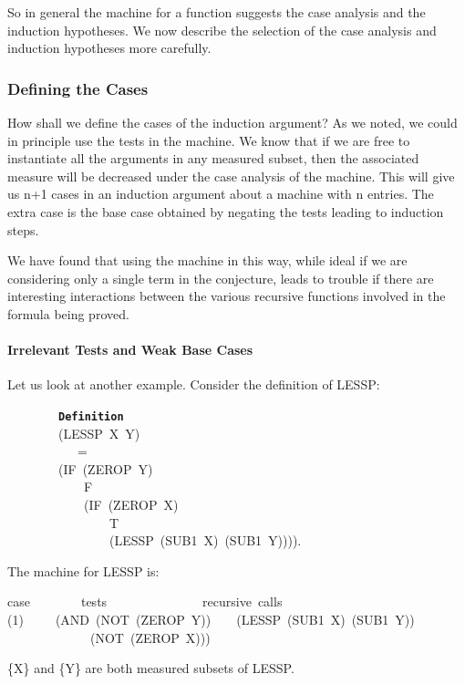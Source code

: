 \documentclass[11pt]{book}
\newenvironment{pubasis}{\begin{flushleft}\ttfamily\small}{\normalsize\rmfamily\end{flushleft}}
\newcommand{\axiomordefinition}[1]{\vspace{6pt}\texttt{\textbf{#1}}}
\newcommand{\pubdefaulttextsize}{\large}
\begin{document}
So in general the machine for a function suggests the
case analysis and the induction hypotheses.  We now describe the
selection of the case analysis and induction hypotheses more carefully.
\subsubsection{Defining the Cases}
\pubdefaulttextsize
How shall we define the cases of the induction argument?  As we noted, we could
in principle use the tests in the machine.  We know that if we are free to
instantiate all the arguments in any measured subset, then the
associated measure will be decreased under the case analysis of the machine.
This will give us n+1 cases in an induction argument about a
machine with n entries.  The extra case is the base case obtained
by negating the tests leading to induction steps.

We have found that using the machine in this way, while ideal if we
are considering only a single term in the conjecture, leads to trouble if
there are interesting interactions between the various recursive functions
involved in the formula being proved.
\paragraph{Irrelevant Tests and Weak Base Cases}
\pubdefaulttextsize
Let us look at another example.  Consider the definition of LESSP:
\begin{pubasis}
~~~~~~~~\axiomordefinition{Definition}\\
~~~~~~~~(LESSP~X~Y)\\
~~~~~~~~~~~=\\
~~~~~~~~(IF~(ZEROP~Y)\\
~~~~~~~~~~~~F\\
~~~~~~~~~~~~(IF~(ZEROP~X)\\
~~~~~~~~~~~~~~~~T\\
~~~~~~~~~~~~~~~~(LESSP~(SUB1~X)~(SUB1~Y)))).\\
\end{pubasis}
The machine for LESSP is:
\begin{pubasis}
case~~~~~~~~tests~~~~~~~~~~~~~~~recursive~calls\\

(1)~~~~~(AND~(NOT~(ZEROP~Y))~~~~(LESSP~(SUB1~X)~(SUB1~Y))\\
~~~~~~~~~~~~~(NOT~(ZEROP~X)))\\
\end{pubasis}
\{X\} and \{Y\} are both measured subsets of LESSP.
\end{document}
